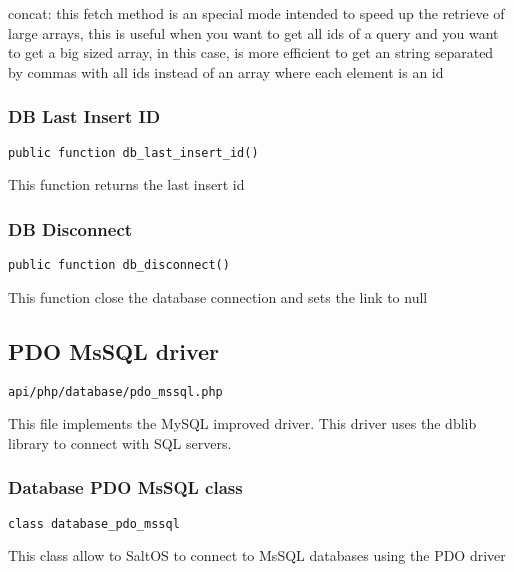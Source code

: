 \documentclass[a4paper]{article}
\begin{document}
concat: this fetch method is an special mode intended to speed up the retrieve of large
arrays, this is useful when you want to get all ids of a query and you want to get a big
sized array, in this case, is more efficient to get an string separated by commas with all
ids instead of an array where each element is an id

\hypertarget{toc324}{}
\subsubsection{DB Last Insert ID}

\begin{lstlisting}
public function db_last_insert_id()
\end{lstlisting}

This function returns the last insert id

\hypertarget{toc325}{}
\subsubsection{DB Disconnect}

\begin{lstlisting}
public function db_disconnect()
\end{lstlisting}

This function close the database connection and sets the link to null

\hypertarget{toc326}{}
\subsection{PDO MsSQL driver}

\begin{lstlisting}
api/php/database/pdo_mssql.php
\end{lstlisting}

This file implements the MySQL improved driver. This driver uses the dblib library to connect
with SQL servers.

\hypertarget{toc327}{}
\subsubsection{Database PDO MsSQL class}

\begin{lstlisting}
class database_pdo_mssql
\end{lstlisting}

This class allow to SaltOS to connect to MsSQL databases using the PDO driver
\end{document}
